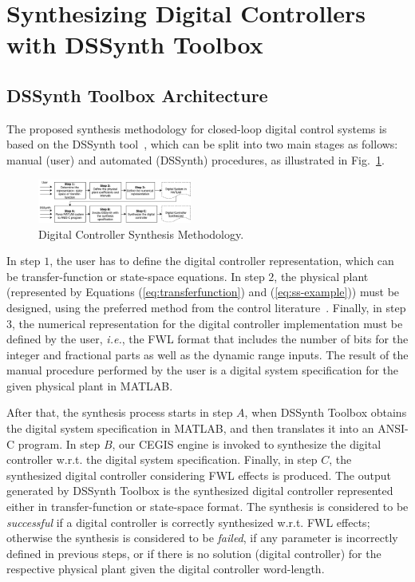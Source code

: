 \documentclass[sigconf]{acmart}
\newcommand\tool{{DSSynth Toolbox}\xspace}
\begin{document}
\section{Synthesizing Digital Controllers with \tool}

\subsection{\tool Architecture}

The proposed synthesis methodology for closed-loop digital control
systems is based on the DSSynth tool~\cite{abate2017, abatecav2017}, 
which can be split into two main stages as follows: manual (user) and 
automated (DSSynth) procedures, as illustrated in Fig.~\ref{fig:synthesis-flow}. 
%
\begin{figure}[ht!]
\centering
\includegraphics[width=0.45\textwidth]{synthesis-flow.pdf}
\caption{Digital Controller Synthesis Methodology.}
\label{fig:synthesis-flow}
\end{figure}

In step $1$, the user has to define the digital controller representation, 
which can be transfer-function or state-space equations. 
In step $2$, the physical plant (represented by Equations (\ref{eq:transferfunction}) 
and (\ref{eq:ss-example})) must be designed, using the preferred method 
from the control literature~\cite{astrom1997computer}. Finally, in step $3$, 
the numerical representation for the digital controller implementation must be 
defined by the user, {\it i.e.}, the FWL format that includes the number of bits for the integer 
and fractional parts as well as the dynamic range inputs. The result of the manual 
procedure performed by the user is a digital system specification for the given 
physical plant in MATLAB. 

After that, the synthesis process starts in step $A$, when \tool obtains the digital system 
specification in MATLAB, and then translates it into an ANSI-C program. 
In step $B$, our CEGIS engine is invoked to synthesize the digital controller w.r.t. the digital system
specification. Finally, in step $C$, the synthesized digital controller considering FWL effects is produced. 
The output generated by \tool is the synthesized digital controller represented either in transfer-function 
or state-space format. The synthesis is considered to be \emph{successful} if a digital controller is correctly 
synthesized w.r.t. FWL effects; otherwise the synthesis is considered to be \emph{failed}, if any parameter is 
incorrectly defined in previous steps, or if there is no solution (digital controller) for the respective physical plant
 given the digital controller word-length.
 
\end{document}
